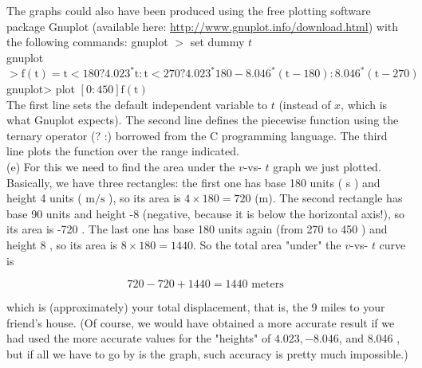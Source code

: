 \documentclass[10pt]{article}
\begin{document}
The graphs could also have been produced using the free plotting software package Gnuplot (available here: \href{http://www.gnuplot.info/download.html}{http://www.gnuplot.info/download.html}) with the following commands: gnuplot $>$ set dummy $t$\\
gnuplot $>\mathrm{f}(\mathrm{t})=\mathrm{t}<180 ? 4.023^{*} \mathrm{t}: \mathrm{t}<270 ? 4.023^{*} 180-8.046^{*}(\mathrm{t}-180): 8.046^{*}(\mathrm{t}-270)$\\
gnuplot> plot $[0: 450] \mathrm{f}(\mathrm{t})$\\
The first line sets the default independent variable to $t$ (instead of $x$, which is what Gnuplot expects). The second line defines the piecewise function using the ternary operator (? :) borrowed from the C programming language. The third line plots the function over the range indicated.\\
(e) For this we need to find the area under the $v$-vs- $t$ graph we just plotted. Basically, we have three rectangles: the first one has base 180 units ( s ) and height 4 units ( $\mathrm{m} / \mathrm{s}$ ), so its area is $4 \times 180=720$ (m). The second rectangle has base 90 units and height -8 (negative, because it is below the horizontal axis!), so its area is -720 . The last one has base 180 units again (from 270 to 450 ) and height 8 , so its area is $8 \times 180=1440$. So the total area "under" the $v$-vs- $t$ curve is

$$
720-720+1440=1440 \text { meters }
$$

which is (approximately) your total displacement, that is, the 9 miles to your friend's house. (Of course, we would have obtained a more accurate result if we had used the more accurate values for the "heights" of $4.023,-8.046$, and 8.046 , but if all we have to go by is the graph, such accuracy is pretty much impossible.)
\end{document}
